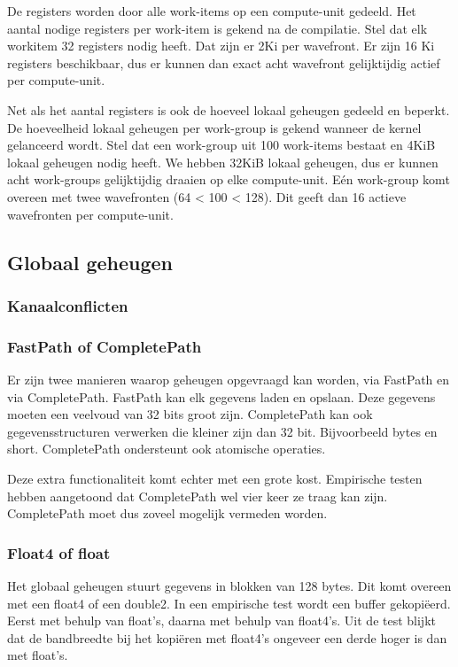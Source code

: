 De registers worden door alle work-items op een compute-unit gedeeld. Het aantal nodige registers per work-item is gekend na de compilatie. Stel dat elk workitem 32 registers nodig heeft. Dat zijn er 2Ki per wavefront. Er zijn 16 Ki registers beschikbaar, dus er kunnen dan exact acht wavefront gelijktijdig actief per compute-unit. 

Net als het aantal registers is ook de hoeveel lokaal geheugen gedeeld en beperkt. De hoeveelheid lokaal geheugen per work-group is gekend wanneer de kernel gelanceerd wordt. Stel dat een work-group uit 100 work-items bestaat en 4KiB lokaal geheugen nodig heeft. We hebben 32KiB lokaal geheugen, dus er kunnen acht work-groups gelijktijdig draaien op elke compute-unit. E\'en work-group komt overeen met twee wavefronten (64 < 100 < 128). Dit geeft dan 16 actieve wavefronten per compute-unit.
 

\subsection{Globaal geheugen}
\subsubsection{Kanaalconflicten}

\subsubsection{FastPath of CompletePath}
Er zijn twee manieren waarop geheugen opgevraagd kan worden, via FastPath en via CompletePath. FastPath kan elk gegevens laden en opslaan. Deze gegevens moeten een veelvoud van 32 bits groot zijn. CompletePath kan ook gegevensstructuren verwerken die kleiner zijn dan 32 bit. Bijvoorbeeld bytes en short. CompletePath ondersteunt ook atomische operaties.

Deze extra functionaliteit komt echter met een grote kost. Empirische testen  hebben aangetoond dat CompletePath wel vier keer ze traag kan zijn. CompletePath moet dus zoveel mogelijk vermeden worden.

\subsubsection{Float4 of float}
Het globaal geheugen stuurt gegevens in blokken van 128 bytes. Dit komt overeen met een float4 of een double2. In een empirische test wordt een buffer gekopi\"eerd. Eerst met behulp van float's, daarna met behulp van float4's. Uit de test blijkt dat de bandbreedte bij het kopi\"eren met float4's ongeveer een derde hoger is dan met float's. 

